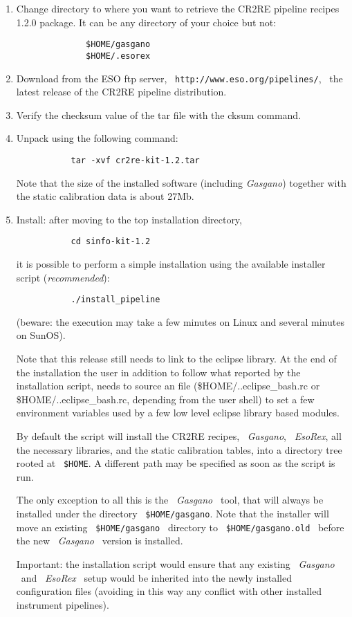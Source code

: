 \begin{enumerate}
\item Change directory to where you want to retrieve the CR2RE pipeline 
recipes 1.2.0 package. It can be any directory of your choice but not: 
\begin{verbatim}
              $HOME/gasgano 
              $HOME/.esorex
\end{verbatim}

\item Download from the ESO ftp server, 
\ \texttt{http://www.eso.org/pipelines/},
\ the latest release of the CR2RE pipeline distribution.

\item Verify the checksum value of the tar file with the cksum command. 

\item Unpack using the following command:
\begin{verbatim}
           tar -xvf cr2re-kit-1.2.tar
\end{verbatim}

Note that the size of the installed software (including {\it Gasgano}) 
together with the static calibration data is about 27Mb. 

\item Install: after moving to the top installation directory,
\begin{verbatim}
           cd sinfo-kit-1.2
\end{verbatim}

it is possible to perform a simple installation using the available 
installer script ({\it recommended}):
\begin{verbatim}
           ./install_pipeline
\end{verbatim}

(beware: the execution may take a few minutes on Linux and several minutes 
on SunOS).

Note that this release still needs to link to the eclipse library.
At the end of the installation the user in addition to follow what reported
by the installation script, needs to source an file 
(\$HOME/..eclipse\_bash.rc or \$HOME/..eclipse\_bash.rc, depending from the
user shell) to set a few environment variables used by a few
low level eclipse library based modules.

By default the script will install the CR2RE recipes, \ {\it Gasgano}, 
\ {\it EsoRex}, all the necessary libraries, and the static calibration 
tables, into a directory tree rooted at \ {\tt \$HOME}. A different path 
may be specified as soon as the script is run.

The only exception to all this is the \ {\it Gasgano} \ tool, that will 
always be installed under the directory \ {\tt \$HOME/gasgano}. Note that 
the installer will move an existing \ {\tt \$HOME/gasgano} \ directory to 
\ {\tt \$HOME/gasgano.old} \ before the new \ {\it Gasgano} \ version is 
installed.

Important: the installation script would ensure that any existing 
\ {\it Gasgano} \  and \ {\it EsoRex} \ setup would be inherited 
into the newly installed configuration files (avoiding in this way 
any conflict with other installed instrument pipelines).
\end{enumerate}

